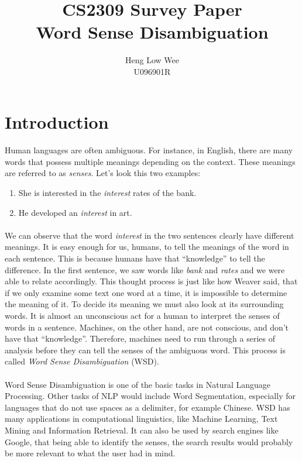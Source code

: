 \documentclass[12 pt]{article}
\begin{document}

\title{CS2309 Survey Paper \\ Word Sense Disambiguation}
\author{Heng Low Wee \\ U096901R}
\date{}
\maketitle
\thispagestyle{fancy}
\section{Introduction}
\label{introduction}
\paragraph{}
Human languages are often ambiguous. For instance, in English, there are many words that possess multiple meanings depending on the context. These meanings are referred to as \textit{senses}. Let's look this two examples:
\begin{enumerate}
\item{She is interested in the \textit{interest} rates of the bank.}	
\item{He developed an \textit{interest} in art.}
\end{enumerate}
\paragraph{}
We can observe that the word \textit{interest} in the two sentences clearly have different meanings. It is easy enough for us, humans, to tell the meanings of the word in each sentence. This is because humans have that ``knowledge'' to tell the difference. In the first sentence, we saw words like \textit{bank} and \textit{rates} and we were able to relate accordingly. This thought process is just like how Weaver \cite{weaver} said, that if we only examine some text one word at a time, it is impossible to determine the meaning of it. To decide its meaning we must also look at its surrounding words. It is almost an unconscious act for a human to interpret the senses of words in a sentence. Machines, on the other hand, are not conscious, and don't have that ``knowledge''. Therefore, machines need to run through a series of analysis before they can tell the senses of the ambiguous word. This process is called \textit{Word Sense Disambiguation} (WSD).

\paragraph{}
Word Sense Disambiguation is one of the basic tasks in Natural Language Processing. Other tasks of NLP would include Word Segmentation, especially for languages that do not use spaces as a delimiter, for example Chinese. WSD has many applications in computational linguistics, like Machine Learning, Text Mining and Information Retrieval. It can also be used by search engines like Google, that being able to identify the senses, the search results would probably be more relevant to what the user had in mind.
\end{document}
